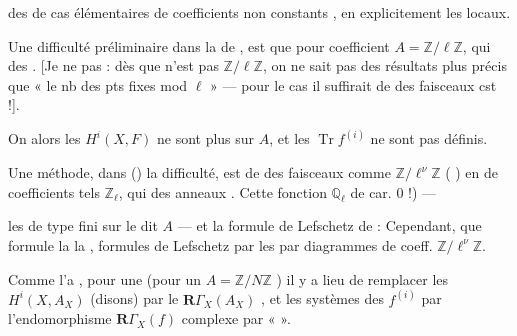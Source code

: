\documentclass[11pt,a4paper]{article}
\begin{document}
des  de cas élémentaires de coefficients non constants
, en  
explicitement les  locaux.

Une difficulté  préliminaire dans la \ill{} \ill{} \ill{} de
 \ill{}, \ill{} est que pour \ill{} \ill{} \ill{}
coefficient $A = \mathbb{Z}/\ell\mathbb{Z}$,  qui \ill{} \ill{} \ill{} \ill{} \ill{} des
 \ill{} \ill{}. [Je ne  pas \ill{}
\ill{}  : dès que \ill{} n'est pas
$\mathbb{Z}/\ell\mathbb{Z}$, on ne sait pas \ill{} des résultats plus précis
que « le nb des pts fixes mod $\ell$ » —  pour le cas
\ill{} il suffirait \ill{} \ill{} de \ill{} \ill{}  des
faisceaux cst !].

On  alors les $H^i(X, F)$ ne sont plus  sur
$A$, et les $\operatorname{Tr} f^{(i)}$ ne sont pas définis.

Une méthode,  dans \ill{} \ill{} ()  la difficulté, est de \ill{} \ill{}
\ill{} \ill{}  \ill{} \ill{} \ill{} \ill{}
\ill{} \ill{} des faisceaux \ill{} \ill{} comme
$\mathbb{Z}/\ell^\nu\mathbb{Z}$ (\ill{} \ill{} \ill{}) en
 \ill{} \ill{} \ill{} \ill{} de coefficients tels
\ill{} $\mathbb{Z}_\ell$, \struck{\ill{}} qui  \ill{} des
anneaux . Cette \ill{} \ill{} \ill{} fonction
$\mathbb{Q}_\ell$ de car. $0$ !) — \ill{}

 \ill{} les 
de type fini sur le dit $A$ \ill{}  — et la formule de
Lefschetz  \ill{} de
 \ill{} \ill{} \ill{} \ill{}  \ill{}
 : Cependant, \ill{} \ill{} \ill{} que \ill{} formule
\ill{}  la  \ill{} \ill{} \ill{} la
, \ill{} \ill{} formules de Lefschetz par les \ill{}
 par diagrammes  \ill{} \ill{} de coeff.
$\mathbb{Z}/\ell^\nu\mathbb{Z}$.

Comme l'a  \ill{}, pour  une \ill{}
\ill{} (pour un $A = \mathbb{Z}/N\mathbb{Z}$ ) il y a lieu
de remplacer les $H^i(X, A_X)$ (disons) par le
  $\mathbf{R}\Gamma_X(A_X)$ , et les systèmes des $f^{(i)}$ par
l'endomorphisme $\mathbf{R}\Gamma_X(f)$ \ill{} \ill{} \ill{} complexe
 par « \ill{} ».
\end{document}
